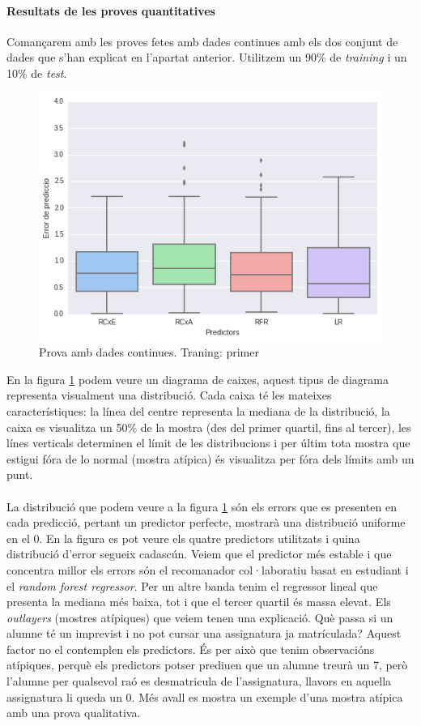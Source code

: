 \documentclass[12pt,a4paper,catalan]{article}
\begin{document}
\paragraph{Resultats de les proves quantitatives}
Comançarem amb les proves fetes amb dades continues amb els dos conjunt de dades que s'han explicat en l'apartat anterior.  Utilitzem un 90\% de \textit{training} i un 10\% de \textit{test}.
\\
\begin{figure}[h]
\centering
\includegraphics[width=.7\linewidth]{img/boxplot_primer_segon.png}
\caption{Prova amb dades continues. Traning: primer}
\label{fig:boxplotdctp}
\end{figure}

En la figura \ref{fig:boxplotdctp} podem veure un diagrama de caixes, aquest tipus de diagrama representa visualment una distribució. Cada caixa té les mateixes característiques: la línea del centre representa la mediana de la distribució, la caixa es visualitza un 50\% de la mostra (des del primer quartil, fins al tercer), les línes verticals determinen el límit de les distribucions i per últim tota mostra que estigui fóra de lo normal (mostra atípica) és visualitza per fóra dels límits amb un punt.
\\
\\
La distribució que podem veure a la figura \ref{fig:boxplotdctp} són els errors que es presenten en cada predicció, pertant un predictor perfecte, mostrarà una distribució uniforme en el 0. En la figura es pot veure els quatre predictors utilitzats i quina distribució d'error segueix cadascún. Veiem que el predictor més estable i que concentra millor els errors són el recomanador col·laboratiu basat en estudiant i el \textit{random forest regressor}. Per un altre banda tenim el regressor lineal que presenta la mediana més baixa, tot i que el tercer quartil és massa elevat. Els \textit{outlayers}  (mostres atípiques) que veiem tenen una explicació. Què passa si un alumne té un imprevist i no pot cursar una assignatura ja matrículada? Aquest factor no el contemplen els predictors. És per això que tenim observacións atípiques, perquè els predictors potser prediuen que un alumne treurà un 7, però l'alumne per qualsevol raó es desmatricula de l'assignatura, llavors en aquella assignatura li queda un 0. Més avall es mostra un exemple d'una mostra atípica amb una prova qualitativa.
\end{document}
